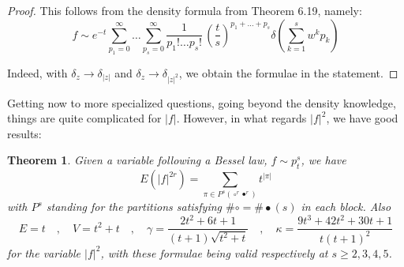 \documentclass[12pt]{amsbook}
\newtheorem{theorem}{Theorem}[chapter]
\begin{document}
\begin{proof}
This follows from the density formula from Theorem 6.19, namely:
$$f\sim e^{-t}\sum_{p_1=0}^\infty\ldots\sum_{p_s=0}^\infty\frac{1}{p_1!\ldots p_s!}\,\left(\frac{t}{s}\right)^{p_1+\ldots+p_s}\delta\left(\sum_{k=1}^sw^kp_k\right)$$

Indeed, with $\delta_z\to\delta_{|z|}$ and $\delta_z\to\delta_{|z|^2}$, we obtain the formulae in the statement.
\end{proof}

Getting now to more specialized questions, going beyond the density knowledge, things are quite complicated for $|f|$. However, in what regards $|f|^2$, we have good results:

\begin{theorem}
Given a variable following a Bessel law, $f\sim p^s_t$, we have
$$E(|f|^{2r})=\sum_{\pi\in P^s(\circ^r\bullet^r)}t^{|\pi|}$$
with $P^s$ standing for the partitions satisfying $\#\circ=\#\bullet(s)$ in each block. Also
$$E=t\quad,\quad V=t^2+t\quad,\quad\gamma=\frac{2t^2+6t+1}{(t+1)\sqrt{t^2+t}}
\quad,\quad \kappa=\frac{9t^3+42t^2+30t+1}{t(t+1)^2}$$
for the variable $|f|^2$, with these formulae being valid respectively at $s\geq 2,3,4,5$.
\end{theorem}
\end{document}
